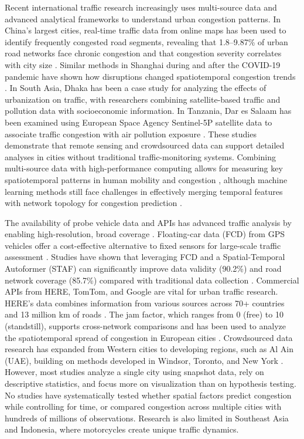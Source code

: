 \documentclass[review,authoryear]{elsarticle}
\begin{document}
Recent international traffic research increasingly uses multi-source data and advanced analytical frameworks to understand urban congestion patterns. In China's largest cities, real-time traffic data from online maps has been used to identify frequently congested road segments, revealing that 1.8--9.87\% of urban road networks face chronic congestion and that congestion severity correlates with city size \citep{Cui2024}. Similar methods in Shanghai during and after the COVID-19 pandemic have shown how disruptions changed spatiotemporal congestion trends \citep{Xu2022}. In South Asia, Dhaka has been a case study for analyzing the effects of urbanization on traffic, with researchers combining satellite-based traffic and pollution data with socioeconomic information. In Tanzania, Dar es Salaam has been examined using European Space Agency Sentinel-5P satellite data to associate traffic congestion with air pollution exposure \citep{Dasgupta2021}. These studies demonstrate that remote sensing and crowdsourced data can support detailed analyses in cities without traditional traffic-monitoring systems. Combining multi-source data with high-performance computing allows for measuring key spatiotemporal patterns in human mobility and congestion \citep{Cai2024}, although machine learning methods still face challenges in effectively merging temporal features with network topology for congestion prediction \citep{Song2019,Ermagun2018}.

The availability of probe vehicle data and APIs has advanced traffic analysis by enabling high-resolution, broad coverage \citep{Leduc2008,Jenelius2015}. Floating-car data (FCD) from GPS vehicles offer a cost-effective alternative to fixed sensors for large-scale traffic assessment \citep{Zhang2025}. Studies have shown that leveraging FCD and a Spatial-Temporal Autoformer (STAF) can significantly improve data validity (90.2\%) and road network coverage (85.7\%) compared with traditional data collection \citep{Ma2024}. Commercial APIs from HERE, TomTom, and Google are vital for urban traffic research. HERE's data combines information from various sources across 70+ countries and 13 million km of roads \citep{HERE2024}. The jam factor, which ranges from 0 (free) to 10 (standstill), supports cross-network comparisons and has been used to analyze the spatiotemporal spread of congestion in European cities \citep{Rempe2016,Saberi2020}. Crowdsourced data research has expanded from Western cities to developing regions, such as Al Ain (UAE), building on methods developed in Windsor, Toronto, and New York \citep{Alkaabi2024}. However, most studies analyze a single city using snapshot data, rely on descriptive statistics, and focus more on visualization than on hypothesis testing. No studies have systematically tested whether spatial factors predict congestion while controlling for time, or compared congestion across multiple cities with hundreds of millions of observations. Research is also limited in Southeast Asia and Indonesia, where motorcycles create unique traffic dynamics.
\end{document}
